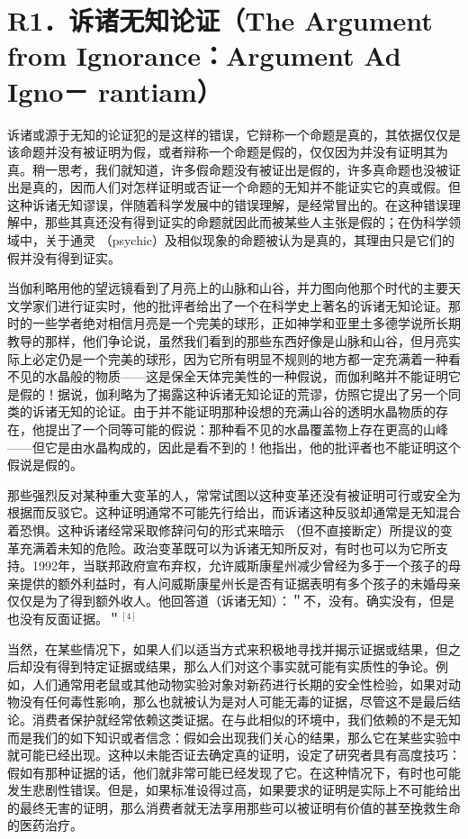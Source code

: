 \section*{R1．诉诸无知论证（The Argument from Ignorance：Argument Ad Igno－ rantiam）}
诉诸或源于无知的论证犯的是这样的错误，它辩称一个命题是真的，其依据仅仅是该命题并没有被证明为假，或者辩称一个命题是假的，仅仅因为并没有证明其为真。稍一思考，我们就知道，许多假命题没有被证出是假的，许多真命题也没被证出是真的，因而人们对怎样证明或否证一个命题的无知并不能证实它的真或假。但这种诉诸无知谬误，伴随着科学发展中的错误理解，是经常冒出的。在这种错误理解中，那些其真还没有得到证实的命题就因此而被某些人主张是假的；在伪科学领域中，关于通灵 （psychic）及相似现象的命题被认为是真的，其理由只是它们的假并没有得到证实。

当伽利略用他的望远镜看到了月亮上的山脉和山谷，并力图向他那个时代的主要天文学家们进行证实时，他的批评者给出了一个在科学史上著名的诉诸无知论证。那时的一些学者绝对相信月亮是一个完美的球形，正如神学和亚里土多德学说所长期教导的那样，他们争论说，虽然我们看到的那些东西好像是山脉和山谷，但月亮实际上必定仍是一个完美的球形，因为它所有明显不规则的地方都一定充满着一种看不见的水晶般的物质——这是保全天体完美性的一种假说，而伽利略并不能证明它是假的！据说，伽利略为了揭露这种诉诸无知论证的荒谬，仿照它提出了另一个同类的诉诸无知的论证。由于并不能证明那种设想的充满山谷的透明水晶物质的存在，他提出了一个同等可能的假说：那种看不见的水晶覆盖物上存在更高的山峰——但它是由水晶构成的，因此是看不到的！他指出，他的批评者也不能证明这个假说是假的。

那些强烈反对某种重大变革的人，常常试图以这种变革还没有被证明可行或安全为根据而反驳它。这种证明通常不可能先行给出，而诉诸这种反驳却通常是无知混合着恐惧。这种诉诸经常采取修辞问句的形式来暗示 （但不直接断定）所提议的变革充满着未知的危险。政治变革既可以为诉诸无知所反对，有时也可以为它所支持。1992年，当联邦政府宣布弃权，允许威斯康星州减少曾经为多于一个孩子的母亲提供的额外利益时，有人问威斯康星州长是否有证据表明有多个孩子的未婚母亲仅仅是为了得到额外收人。他回答道（诉诸无知）：＂不，没有。确实没有，但是也没有反面证据。＂${ }^{[4]}$

当然，在某些情况下，如果人们以适当方式来积极地寻找并揭示证据或结果，但之后却没有得到特定证据或结果，那么人们对这个事实就可能有实质性的争论。例如，人们通常用老鼠或其他动物实验对象对新药进行长期的安全性检验，如果对动物没有任何毒性影响，那么也就被认为是对人可能无毒的证据，尽管这不是最后结论。消费者保护就经常依赖这类证据。在与此相似的环境中，我们依赖的不是无知而是我们的如下知识或者信念：假如会出现我们关心的结果，那么它在某些实验中就可能已经出现。这种以未能否证去确定真的证明，设定了研究者具有高度技巧：假如有那种证据的话，他们就非常可能已经发现了它。在这种情况下，有时也可能发生悲剧性错误。但是，如果标准设得过高，如果要求的证明是实际上不可能给出的最终无害的证明，那么消费者就无法享用那些可以被证明有价值的甚至挽救生命的医药治疗。


